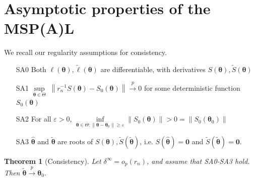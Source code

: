 \documentclass[11pt, a4paper]{article}
\newcommand*{\bb}{\boldsymbol}
\newcommand{\vnorm}[1]{\ensuremath{{\left\| #1 \right\|}}}
\theoremstyle{example} \newtheorem{example}{Example}[section]
\theoremstyle{theorem} \newtheorem{theorem}{Theorem}[section]
\theoremstyle{theorem }\newtheorem{proposition}{Proposition}[section]
\theoremstyle{theorem }\newtheorem{corollary}{Corollary}[section]
\def\btheta{\bb{\theta}}
\def\b0{\bb{0}}
\def\btnod{\bb{\theta}_0}
\def\bttilde{\tilde{\bb{\theta}}}
\begin{document}
	\section{Asymptotic properties of the MSP(A)L} \label{sec:ass+res1} 
	We recall our regularity assumptions for consistency.
	\begin{itemize}
		\item[SA0] Both $\ell(\btheta),\tilde{\ell}(\btheta)$ are differentiable, with  derivatives $S(\btheta),\tilde{S}(\btheta)$ 
		\item[SA1] $\underset{\btheta \in \Theta}{\sup} \; \vnorm{r_n^{-1} S(\btheta) - S_0(\btheta)} \overset{p}{\to}0$ for some deterministic function $S_0(\btheta)$ 
		\item[SA2] For all $\varepsilon>0$, $\underset{\btheta \in \Theta: \vnorm{\btheta-\btnod}\geq \varepsilon}{\inf} \vnorm{S_0(\btheta) }>0 = \vnorm{S_0(\btnod)}$ 
		\item[SA3] $\hat{\btheta}$ and $\bttilde$ are roots of $S(\btheta),\tilde{S}(\bttilde)$, i.e. $S(\hat{\btheta}) = \b0$ and $\tilde{S}(\bttilde) = \b0$. 
	\end{itemize}
	\begin{theorem}[Consistency]
		\label{thm:soft_pen_cons}
		Let $\delta^\infty = o_p(r_n)$, and assume that SA0-SA3 hold. Then $\bttilde \overset{p}{\to} \btnod$.  
	\end{theorem}
\end{document}
